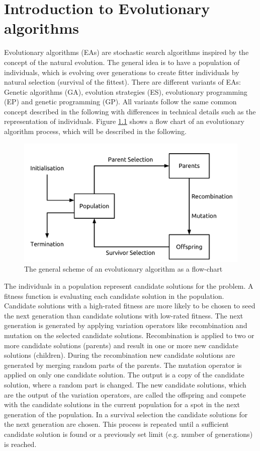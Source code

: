 \newpage
\chapter{Introduction to Evolutionary algorithms}
\label{sec:EA}
Evolutionary algorithms (EAs) are stochastic search algorithms inspired by the concept of the natural evolution. The general idea is to have a population of individuals, which is evolving over generations to create fitter individuals by natural selection (survival of the fittest). There are different variants of EAs: Genetic algorithms (GA), evolution strategies (ES), evolutionary programming (EP) and genetic programming (GP). All variants follow the same common concept described in the following with differences in technical details such as the representation of individuals\cite{Eiben}. Figure \ref{fig:eaflowchart} shows a flow chart of an evolutionary algorithm process, which will be described in the following.\\
\begin{figure}[H]
	\centering
	\includegraphics[scale=0.27]{./Figures/EAFlowchart}
	\caption{The general scheme of an evolutionary algorithm as a flow-chart \cite{Eiben}}
	\label{fig:eaflowchart}
\end{figure}
The individuals in a population represent candidate solutions for the problem. A fitness function is evaluating each candidate solution in the population. Candidate solutions with a high-rated fitness are more likely to be chosen to seed the next generation than candidate solutions with low-rated fitness. The next generation is generated by applying variation operators like recombination and mutation on the selected candidate solutions. Recombination is applied to two or more candidate solutions (parents) and result in one or more new candidate solutions (children). During the recombination new candidate solutions are generated by merging random parts of the parents. The mutation operator is applied on only one candidate solution. The output is a copy of the candidate solution, where a random part is changed. The new candidate solutions, which are the output of the variation operators, are called the offspring and compete with the candidate solutions in the current population for a spot in the next generation of the population. In a survival selection the candidate solutions for the next generation are chosen. This process is repeated until a sufficient candidate solution is found or a previously set limit (e.g. number of generations) is reached.\\
